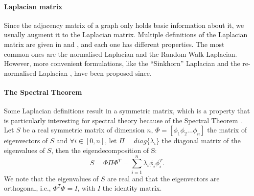 \paragraph{Laplacian matrix}
Since the adjacency matrix of a graph only holds basic information about it, we usually augment it to the Laplacian matrix.
Multiple definitions of the Laplacian matrix are given in \cite{chung_spectral_1997} and \cite{siam_slides_2016}, and each one has different properties.
The most common ones are the normalised Laplacian and the Random Walk Laplacian.
However, more convenient formulations, like the ``Sinkhorn'' Laplacian \cite{milanfar_symmetrizing_2013} and the re-normalised Laplacian \cite{siam_slides_2016} \cite{milanfar_new_2016}, have been proposed since.

\paragraph{The Spectral Theorem}
Some Laplacian definitions result in a symmetric matrix, which is a property that is particularly interesting for spectral theory because of the Spectral Theorem \cite{zhang_spectral_2010}.
Let \(S\) be a real symmetric matrix of dimension \(n\), \(\Phi = [\phi_1 \phi_2 \dots \phi_n ]\) the matrix of eigenvectors of \(S\) and \(\forall i \in [0,n]\), let \(\Pi = diag\{\lambda_i\}\) the diagonal matrix of the eigenvalues of \(S\), then the eigendecomposition of S:
\[S = \Phi \Pi \Phi^T = \sum_{i=1}^n \lambda_i \phi_i \phi_i^T.\]
We note that the eigenvalues of \(S\) are real and that the eigenvectors are orthogonal, i.e., \(\Phi^T\Phi = I\), with \(I\) the identity matrix.

%
%
%


